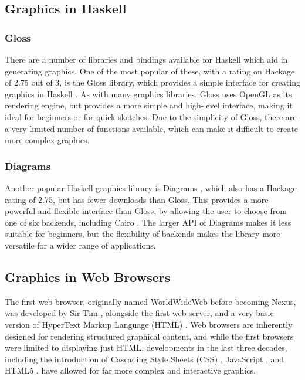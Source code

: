 \documentclass[../main.tex]{subfiles}
\begin{document}
        \subsection{Graphics in Haskell}
            \subsubsection{Gloss}
                There are a number of libraries and bindings available for Haskell which aid in
                    generating graphics.
                One of the most popular of these, with a rating on Hackage of 2.75 out of 3, is
                    the Gloss library, which provides a simple interface for creating graphics in
                    Haskell \citep{hackageGloss}.
                As with many graphics libraries, Gloss uses OpenGL as its rendering engine, but
                    provides a more simple and high-level interface, making it ideal for beginners
                    or for quick sketches.
                Due to the simplicity of Gloss, there are a very limited number of functions
                    available, which can make it difficult to create more complex graphics.

            \subsubsection{Diagrams}
                Another popular Haskell graphics library is Diagrams \citep{hackageDiagrams},
                    which also has a Hackage rating of 2.75, but has fewer downloads than Gloss.
                This provides a more powerful and flexible interface than Gloss, by allowing
                    the user to choose from one of six backends, including Cairo \citep{cairo}.
                The larger API of Diagrams makes it less suitable for beginners, but the
                    flexibility of backends makes the library more versatile for a wider range of
                    applications.


        \subsection{Graphics in Web Browsers}
            The first web browser, originally named WorldWideWeb before becoming Nexus, was
                developed by Sir Tim \citet{worldWideWeb}, alongside the first web server, and
                a very basic version of HyperText Markup Language (HTML) \citep{html}.
            Web browsers are inherently designed for rendering structured graphical
                content, and while the first browsers were limited to displaying just HTML,
                developments in the last three decades, including the introduction of Cascading
                Style Sheets (CSS) \citep{css}, JavaScript \citep{js}, and HTML5 \citep{html5},
                have allowed for far more complex and interactive graphics.
\end{document}
